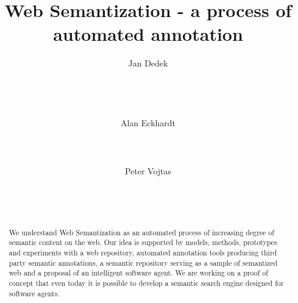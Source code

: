 \documentclass{www2009-submission}
\begin{document}
%
\title{Web Semantization - a process of automated annotation}


\author{
\alignauthor Jan Dedek\\
       \\
       \\
       \\
       \\
\alignauthor Alan Eckhardt\\
       \\
       \\
       \\
\alignauthor Peter Vojtas\\
       \\
       \\
       \\
}

\maketitle
\begin{abstract}
We understand Web Semantization as an automated process of increasing degree of semantic content on the web. %
Our idea is supported by models, methods, prototypes and experiments with a web repository, automated annotation tools producing third party semantic annotations, a semantic repository serving as a sample of semantized web and a proposal of an intelligent software agent. We are working on a proof of concept that even today it is possible to develop a semantic search engine designed for software agents.
\end{abstract}

\end{document}
